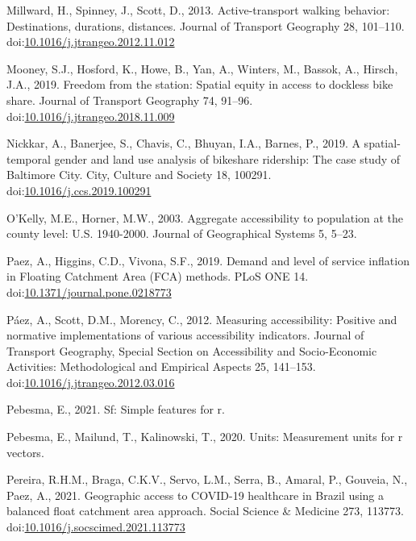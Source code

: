 \documentclass[]{elsarticle} %
\begin{document}
\leavevmode\hypertarget{ref-millwardActivetransportWalkingBehavior2013}{}%
Millward, H., Spinney, J., Scott, D., 2013. Active-transport walking
behavior: Destinations, durations, distances. Journal of Transport
Geography 28, 101--110.
doi:\href{https://doi.org/10.1016/j.jtrangeo.2012.11.012}{10.1016/j.jtrangeo.2012.11.012}

\leavevmode\hypertarget{ref-mooneyFreedomStationSpatial2019}{}%
Mooney, S.J., Hosford, K., Howe, B., Yan, A., Winters, M., Bassok, A.,
Hirsch, J.A., 2019. Freedom from the station: Spatial equity in access
to dockless bike share. Journal of Transport Geography 74, 91--96.
doi:\href{https://doi.org/10.1016/j.jtrangeo.2018.11.009}{10.1016/j.jtrangeo.2018.11.009}

\leavevmode\hypertarget{ref-nickkarSpatialtemporalGenderLand2019}{}%
Nickkar, A., Banerjee, S., Chavis, C., Bhuyan, I.A., Barnes, P., 2019. A
spatial-temporal gender and land use analysis of bikeshare ridership:
The case study of Baltimore City. City, Culture and Society 18, 100291.
doi:\href{https://doi.org/10.1016/j.ccs.2019.100291}{10.1016/j.ccs.2019.100291}

\leavevmode\hypertarget{ref-okelly2003aggregate}{}%
O'Kelly, M.E., Horner, M.W., 2003. Aggregate accessibility to population
at the county level: U.S. 1940-2000. Journal of Geographical Systems 5,
5--23.

\leavevmode\hypertarget{ref-paezDemandLevelService2019}{}%
Paez, A., Higgins, C.D., Vivona, S.F., 2019. Demand and level of service
inflation in Floating Catchment Area (FCA) methods. PLoS ONE 14.
doi:\href{https://doi.org/10.1371/journal.pone.0218773}{10.1371/journal.pone.0218773}

\leavevmode\hypertarget{ref-paezMeasuringAccessibilityPositive2012}{}%
Páez, A., Scott, D.M., Morency, C., 2012. Measuring accessibility:
Positive and normative implementations of various accessibility
indicators. Journal of Transport Geography, Special Section on
Accessibility and Socio-Economic Activities: Methodological and
Empirical Aspects 25, 141--153.
doi:\href{https://doi.org/10.1016/j.jtrangeo.2012.03.016}{10.1016/j.jtrangeo.2012.03.016}

\leavevmode\hypertarget{ref-R-sf}{}%
Pebesma, E., 2021. Sf: Simple features for r.

\leavevmode\hypertarget{ref-R-units}{}%
Pebesma, E., Mailund, T., Kalinowski, T., 2020. Units: Measurement units
for r vectors.

\leavevmode\hypertarget{ref-pereiraGeographicAccessCOVID192021}{}%
Pereira, R.H.M., Braga, C.K.V., Servo, L.M., Serra, B., Amaral, P.,
Gouveia, N., Paez, A., 2021. Geographic access to COVID-19 healthcare in
Brazil using a balanced float catchment area approach. Social Science \&
Medicine 273, 113773.
doi:\href{https://doi.org/10.1016/j.socscimed.2021.113773}{10.1016/j.socscimed.2021.113773}
\end{document}
